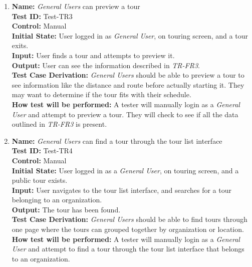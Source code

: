\documentclass[12pt, titlepage]{article}
\begin{document}
\begin{enumerate}
    \item
    \textbf{Name:} \textit{General Users} can preview a tour \label{itm:Test-TR3} \\
    \textbf{Test ID:} Test-TR3 \\
    \textbf{Control:} Manual \\
    \textbf{Initial State:} User logged in as \textit{General User}, on touring screen, and a tour exits. \\
    \textbf{Input:} User finds a tour and attempts to preview it. \\
    \textbf{Output:} User can see the information described in \textit{TR-FR3}. \\
    \textbf{Test Case Derivation:} \textit{General Users} should be able to preview a tour to see information like the distance and route before actually starting it. They may want to determine if the tour fits with their schedule. \\
    \textbf{How test will be performed:} A tester will manually login as a \textit{General User} and attempt to preview a tour. They will check to see if all the data outlined in \textit{TR-FR3} is present.

    \item
    \textbf{Name:} \textit{General Users} can find a tour through the tour list interface \label{itm:Test-TR4} \\
    \textbf{Test ID:} Test-TR4 \\
    \textbf{Control:} Manual \\
    \textbf{Initial State:} User logged in as a \textit{General User}, on touring screen, and a public tour exists. \\
    \textbf{Input:} User navigates to the tour list interface, and searches for a tour belonging to an organization. \\
    \textbf{Output:} The tour has been found. \\
    \textbf{Test Case Derivation:} \textit{General Users} should be able to find tours through one page where the tours can grouped together by organization or location. \\
    \textbf{How test will be performed:} A tester will manually login as a \textit{General User} and attempt to find a tour through the tour list interface that belongs to an organization.


\end{enumerate}
\end{document}
